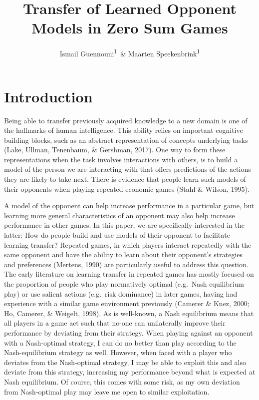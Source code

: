 \documentclass[man,floatsintext]{apa6}
\affiliation{
\vspace{0.5cm}
\textsuperscript{1} Department of Experimental Psychology, University College London}
\title{Transfer of Learned Opponent Models in Zero Sum Games}
\author{Ismail Guennouni\textsuperscript{1}~\& Maarten Speekenbrink\textsuperscript{1}}
\date{}
\begin{document}
\maketitle

\hypertarget{introduction}{%
\section{Introduction}\label{introduction}}

Being able to transfer previously acquired knowledge to a new domain is one of the hallmarks of human intelligence. This ability relies on important cognitive building blocks, such as an abstract representation of concepts underlying tasks (Lake, Ullman, Tenenbaum, \& Gershman, 2017). One way to form these representations when the task involves interactions with others, is to build a model of the person we are interacting with that offers predictions of the actions they are likely to take next. There is evidence that people learn such models of their opponents when playing repeated economic games (Stahl \& Wilson, 1995).

A model of the opponent can help increase performance in a particular game, but learning more general characteristics of an opponent may also help increase performance in other games. In this paper, we are specifically interested in the latter: How do people build and use models of their opponent to facilitate learning transfer? Repeated games, in which players interact repeatedly with the same opponent and have the ability to learn about their opponent's strategies and preferences (Mertens, 1990) are particularly useful to address this question. The early literature on learning transfer in repeated games has mostly focused on the proportion of people who play normatively optimal (e.g.~Nash equilibrium play) or use salient actions (e.g.~risk dominance) in later games, having had experience with a similar game environment previously (Camerer \& Knez, 2000; Ho, Camerer, \& Weigelt, 1998). As is well-known, a Nash equilibrium means that all players in a game act such that no-one can unilaterally improve their performance by deviating from their strategy. When playing against an opponent with a Nash-optimal strategy, I can do no better than play according to the Nash-equilibrium strategy as well. However, when faced with a player who deviates from the Nash-optimal strategy, I may be able to exploit this and also deviate from this strategy, increasing my performance beyond what is expected at Nash equilibrium. Of course, this comes with some risk, as my own deviation from Nash-optimal play may leave me open to similar exploitation.
\end{document}
